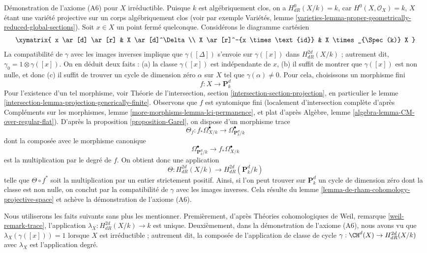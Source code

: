 \medskip\noindent
Démonstration de l'axiome (A6) pour $X$ irréductible. Puisque $k$ est algébriquement
clos, on a $H^0_{dR}(X/k) = k$, car $H^0(X, \mathcal{O}_X) = k$,
$X$ étant une variété projective sur un corps algébriquement clos
(voir par exemple Variétés, lemme
\ref{varieties-lemma-proper-geometrically-reduced-global-sections}).
Soit $x \in X$ un point fermé quelconque.
Considérons le diagramme cartésien
$$
\xymatrix{
x \ar[d] \ar[r] & X \ar[d]^\Delta \\
X \ar[r]^-{x \times \text{id}} & X \times_{\Spec(k)} X
}
$$
La compatibilité de $\gamma$ avec les images inverses implique que
$\gamma([\Delta])$ s'envoie sur $\gamma([x])$ dans $H_{dR}^{2d}(X/k)$ ;
autrement dit, $\gamma_0 = 1 \otimes \gamma([x])$.
On en déduit deux faits : (a) la classe
$\gamma([x])$ est indépendante de $x$, (b) il suffit
de montrer que $\gamma([x])$ est non nulle, et donc (c)
il suffit de trouver un cycle de dimension zéro $\alpha$ sur $X$ tel que
$\gamma(\alpha) \not = 0$. Pour cela, choisissons un morphisme
fini
$$
f : X \longrightarrow \mathbf{P}^d_k
$$
Pour l'existence d'un tel morphisme, voir
Théorie de l'intersection, section \ref{intersection-section-projection},
en particulier le lemme \ref{intersection-lemma-projection-generically-finite}.
Observons que $f$ est syntomique fini (localement d'intersection complète
d'après Compléments sur les morphismes, lemme \ref{more-morphisms-lemma-lci-permanence},
et plat d'après Algèbre, lemme \ref{algebra-lemma-CM-over-regular-flat}).
D'après la proposition \ref{proposition-Garel}, on dispose d'un morphisme trace
$$
\Theta_f :
f_*\Omega^\bullet_{X/k}
\longrightarrow
\Omega^\bullet_{\mathbf{P}^d_k/k}
$$
dont la composée avec le morphisme canonique
$$
\Omega^\bullet_{\mathbf{P}^d_k/k}
\longrightarrow
f_*\Omega^\bullet_{X/k}
$$
est la multiplication par le degré de $f$. On obtient donc une application
$$
\Theta : H_{dR}^{2d}(X/k) \to H_{dR}^{2d}(\mathbf{P}^d_k/k)
$$
telle que $\Theta \circ f^*$ soit la multiplication par un entier strictement positif.
Ainsi, si l'on peut trouver sur $\mathbf{P}^d_k$ un cycle de dimension zéro dont la classe
est non nulle, on conclut par la compatibilité de $\gamma$
avec les images inverses. Cela résulte du
lemme \ref{lemma-de-rham-cohomology-projective-space} et achève
la démonstration de l'axiome (A6).

\medskip\noindent
Nous utiliserons les faits suivants sans plus les mentionner.
Premièrement, d'après Théories cohomologiques de Weil, remarque \ref{weil-remark-trace},
l'application $\lambda_X : H^{2d}_{dR}(X/k) \to k$ est unique.
Deuxièmement, dans la démonstration de l'axiome (A6), nous avons
vu que $\lambda_X(\gamma([x])) = 1$ lorsque $X$ est irréductible ; autrement dit,
la composée de l'application de classe de cycle
$\gamma : \CH^d(X) \to H_{dR}^{2d}(X/k)$ avec $\lambda_X$
est l'application degré.


